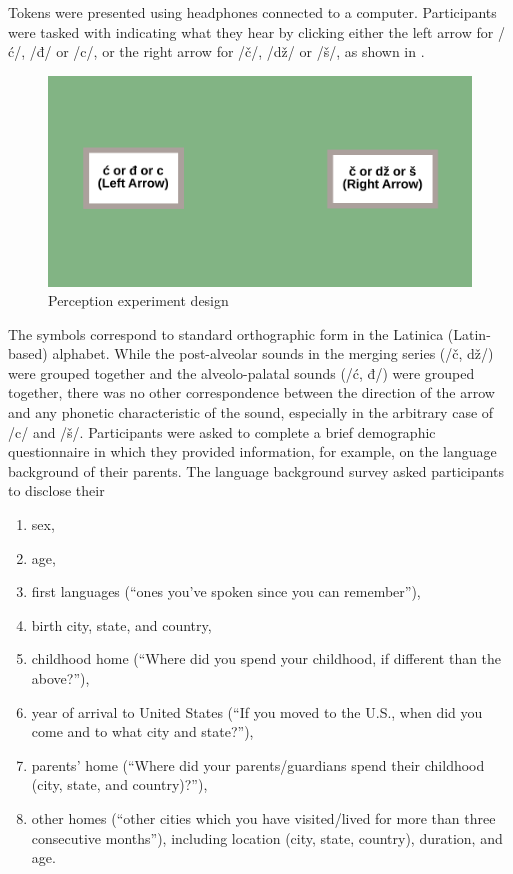 \documentclass[output=paper,
modfonts,
newtxmath,
hidelinks,
]{langscibook}
\begin{document}
Tokens were presented using headphones connected to a computer. Participants were tasked with indicating what they hear by clicking either the left arrow for /ć/, /đ/ or /c/, or the right arrow for /č/, /dž/ or /š/, as shown in .

\begin{figure}[t]
\includegraphics[height=.3\textheight]{figures/MCFigure4.pdf}
\caption{\label{fig:mihajlovic:4} Perception experiment design}
\end{figure}

The symbols correspond to standard orthographic form in the Latinica (Latin-based) alphabet. While the post-alveolar sounds in the merging series (/č, dž/) were grouped together and the alveolo-palatal sounds (/ć, đ/) were grouped together, there was no other correspondence between the direction of the arrow and any phonetic characteristic of the sound, especially in the arbitrary case of /c/ and /š/. Participants were asked to complete a brief demographic questionnaire in which they provided information, for example, on the language background of their parents. The language background survey asked participants to disclose their

\begin{enumerate}
\item sex, 
\item age, 
\item first languages (“ones you’ve spoken since you can remember”), 
\item birth city, state, and country,
\item childhood home (“Where did you spend your childhood, if different than the above?”), 
\item year of arrival to United States (“If you moved to the U.S., when did you come and to what city and state?”), 
\item parents’ home (“Where did your parents/guardians spend their childhood (city, state, and country)?”),
\item other homes (“other cities which you have visited/lived for more than three consecutive months”), including location (city, state, country), duration, and age.
\end{enumerate}
\end{document}
